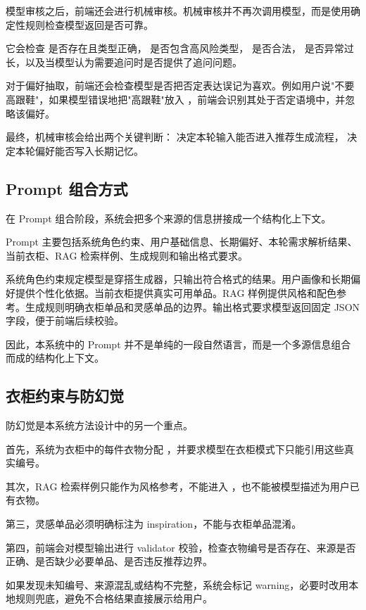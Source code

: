 \documentclass{applemlr}
\begin{document}
模型审核之后，前端还会进行机械审核。机械审核并不再次调用模型，而是使用确定性规则检查模型返回是否可靠。

它会检查  是否存在且类型正确， 是否包含高风险类型， 是否合法， 是否异常过长，以及当模型认为需要追问时是否提供了追问问题。

对于偏好抽取，前端还会检查模型是否把否定表达误记为喜欢。例如用户说"不要高跟鞋"，如果模型错误地把"高跟鞋"放入 ，前端会识别其处于否定语境中，并忽略该偏好。

最终，机械审核会给出两个关键判断： 决定本轮输入能否进入推荐生成流程， 决定本轮偏好能否写入长期记忆。

\subsection{Prompt 组合方式}

在 Prompt 组合阶段，系统会把多个来源的信息拼接成一个结构化上下文。

Prompt 主要包括系统角色约束、用户基础信息、长期偏好、本轮需求解析结果、当前衣柜、RAG 检索样例、生成规则和输出格式要求。

系统角色约束规定模型是穿搭生成器，只输出符合格式的结果。用户画像和长期偏好提供个性化依据。当前衣柜提供真实可用单品。RAG 样例提供风格和配色参考。生成规则明确衣柜单品和灵感单品的边界。输出格式要求模型返回固定 JSON 字段，便于前端后续校验。

因此，本系统中的 Prompt 并不是单纯的一段自然语言，而是一个多源信息组合而成的结构化上下文。

\subsection{衣柜约束与防幻觉}

防幻觉是本系统方法设计中的另一个重点。

首先，系统为衣柜中的每件衣物分配 ，并要求模型在衣柜模式下只能引用这些真实编号。

其次，RAG 检索样例只能作为风格参考，不能进入 ，也不能被模型描述为用户已有衣物。

第三，灵感单品必须明确标注为 inspiration，不能与衣柜单品混淆。

第四，前端会对模型输出进行 validator 校验，检查衣物编号是否存在、来源是否正确、是否缺少必要单品、是否违反推荐边界。

如果发现未知编号、来源混乱或结构不完整，系统会标记 warning，必要时改用本地规则兜底，避免不合格结果直接展示给用户。
\end{document}
